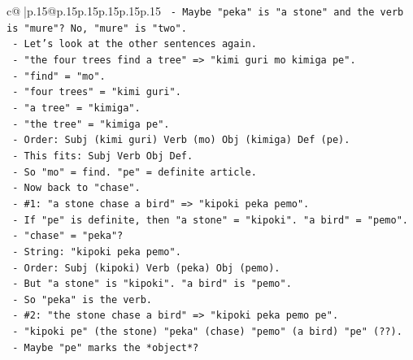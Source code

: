 \documentclass{article}
\begin{document}
{\begin{supertabular}{c@{$\;$}|p{.15\linewidth}@{}p{.15\linewidth}p{.15\linewidth}p{.15\linewidth}p{.15\linewidth}p{.15\linewidth}}
{{{\texttt{                              {-} Maybe "peka" is "a stone" and the verb is "mure"? No, "mure" is "two".} \\
\texttt{                              {-} Let's look at the other sentences again.} \\
\texttt{                              {-} "the four trees find a tree" => "kimi guri mo kimiga pe".} \\
\texttt{                                {-} "find" = "mo".} \\
\texttt{                                {-} "four trees" = "kimi guri".} \\
\texttt{                                {-} "a tree" = "kimiga".} \\
\texttt{                                {-} "the tree" = "kimiga pe".} \\
\texttt{                                {-} Order: Subj (kimi guri) Verb (mo) Obj (kimiga) Def (pe).} \\
\texttt{                                {-} This fits: Subj Verb Obj Def.} \\
\texttt{                                {-} So "mo" = find. "pe" = definite article.} \\
\texttt{                                {-} Now back to "chase".} \\
\texttt{                                {-} \#1: "a stone chase a bird" => "kipoki peka pemo".} \\
\texttt{                                  {-} If "pe" is definite, then "a stone" = "kipoki". "a bird" = "pemo".} \\
\texttt{                                  {-} "chase" = "peka"?} \\
\texttt{                                  {-} String: "kipoki peka pemo".} \\
\texttt{                                  {-} Order: Subj (kipoki) Verb (peka) Obj (pemo).} \\
\texttt{                                  {-} But "a stone" is "kipoki". "a bird" is "pemo".} \\
\texttt{                                  {-} So "peka" is the verb.} \\
\texttt{                                {-} \#2: "the stone chase a bird" => "kipoki peka pemo pe".} \\
\texttt{                                  {-} "kipoki pe" (the stone) "peka" (chase) "pemo" (a bird) "pe" (??).} \\
\texttt{                                  {-} Maybe "pe" marks the *object*?} \\
}}}
\end{supertabular}}
\end{document}
